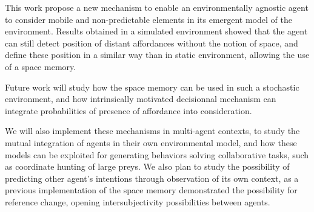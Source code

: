 \documentclass[conference]{IEEEtran}
\begin{document}
This work propose a new mechanism to enable an environmentally agnostic agent to consider mobile and non-predictable elements in its emergent model of the environment. Results obtained in a simulated environment showed that the agent can still detect position of distant affordances without the notion of space, and define these position in a similar way than in static environment, allowing the use of a space memory.

Future work will study how the space memory can be used in such a stochastic environment, and how intrinsically motivated decisionnal mechanism can integrate probabilities of presence of affordance into consideration.

We will also implement these mechanisms in multi-agent contexts, to study the mutual integration of agents in their own environmental model, and how these models can be exploited for generating behaviors solving collaborative tasks, such as coordinate hunting of large preys. We also plan to study the possibility of predicting other agent's intentions through observation of its own context, as a previous implementation of the space memory demonstrated the possibility for reference change, opening intersubjectivity possibilities between agents.





\end{document}
